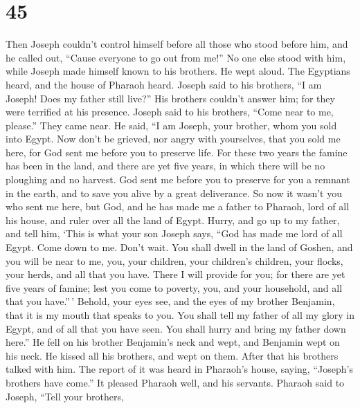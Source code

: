 \hypertarget{section-44}{%
\section{45}\label{section-44}}

 Then Joseph couldn't control himself before all those who
stood before him, and he called out, ``Cause everyone to go out from
me!'' No one else stood with him, while Joseph made himself known to his
brothers.  He wept aloud. The Egyptians heard, and the
house of Pharaoh heard.  Joseph said to his brothers, ``I
am Joseph! Does my father still live?'' His brothers couldn't answer
him; for they were terrified at his presence.  Joseph said
to his brothers, ``Come near to me, please.'' They came near. He said,
``I am Joseph, your brother, whom you sold into Egypt. 
Now don't be grieved, nor angry with yourselves, that you sold me here,
for God sent me before you to preserve life.  For these
two years the famine has been in the land, and there are yet five years,
in which there will be no ploughing and no harvest.  God
sent me before you to preserve for you a remnant in the earth, and to
save you alive by a great deliverance.  So now it wasn't
you who sent me here, but God, and he has made me a father to Pharaoh,
lord of all his house, and ruler over all the land of Egypt.
 Hurry, and go up to my father, and tell him, `This is
what your son Joseph says, ``God has made me lord of all Egypt. Come
down to me. Don't wait.  You shall dwell in the land of
Goshen, and you will be near to me, you, your children, your children's
children, your flocks, your herds, and all that you have.
 There I will provide for you; for there are yet five
years of famine; lest you come to poverty, you, and your household, and
all that you have.''\,'  Behold, your eyes see, and the
eyes of my brother Benjamin, that it is my mouth that speaks to you.
 You shall tell my father of all my glory in Egypt, and
of all that you have seen. You shall hurry and bring my father down
here.''  He fell on his brother Benjamin's neck and wept,
and Benjamin wept on his neck.  He kissed all his
brothers, and wept on them. After that his brothers talked with him.
 The report of it was heard in Pharaoh's house, saying,
``Joseph's brothers have come.'' It pleased Pharaoh well, and his
servants.  Pharaoh said to Joseph, ``Tell your brothers,
